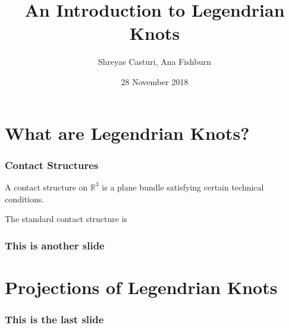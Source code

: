 \documentclass{beamer}
\newcommand{\R}{\mathbb{R}}
\begin{document}
\title{An Introduction to Legendrian Knots}
\author{Shreyas Casturi, Ana Fishburn}
\date{28 November 2018}

\frame{\titlepage}

\section[Intro]{What are Legendrian Knots?}

\begin{frame}
    \frametitle{Contact Structures}
    \begin{definition}
    A \alert{contact structure} on $\R^3$ is a plane bundle
    satisfying certain technical conditions.
    \end{definition}

    The \alert{standard contact structure} is 
\end{frame}

\begin{frame}
\frametitle{This is another slide}
\end{frame}

\section[Proj]{Projections of Legendrian Knots}

\begin{frame}
\frametitle{This is the last slide}
\end{frame}
\end{document}
